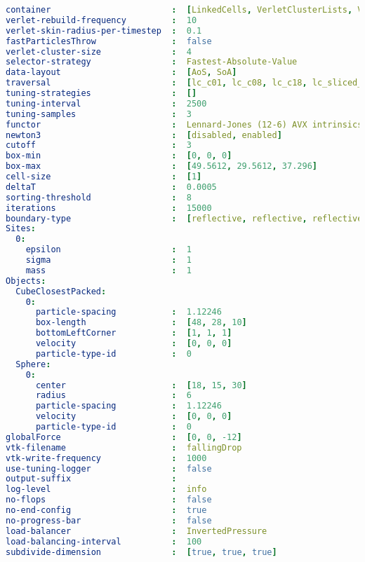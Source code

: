 \begin{lstlisting}[language=yaml,basicstyle=\tiny,  breaklines=true, caption={fallingDrop.yaml}, label={lst:fallingDrop}]
container                        :  [LinkedCells, VerletClusterLists, VerletLists, VerletListsCells]
verlet-rebuild-frequency         :  10
verlet-skin-radius-per-timestep  :  0.1
fastParticlesThrow               :  false
verlet-cluster-size              :  4
selector-strategy                :  Fastest-Absolute-Value
data-layout                      :  [AoS, SoA]
traversal                        :  [lc_c01, lc_c08, lc_c18, lc_sliced_c02, vcl_c01_balanced, vcl_c06, vcl_cluster_iteration, vl_list_iteration, vlc_c01, vlc_c18, vlc_sliced_c02]
tuning-strategies                :  []
tuning-interval                  :  2500
tuning-samples                   :  3
functor                          :  Lennard-Jones (12-6) AVX intrinsics
newton3                          :  [disabled, enabled]
cutoff                           :  3
box-min                          :  [0, 0, 0]
box-max                          :  [49.5612, 29.5612, 37.296]
cell-size                        :  [1]
deltaT                           :  0.0005
sorting-threshold                :  8
iterations                       :  15000
boundary-type                    :  [reflective, reflective, reflective]
Sites:                           
  0:
    epsilon                      :  1
    sigma                        :  1
    mass                         :  1
Objects:                         
  CubeClosestPacked:
    0:  
      particle-spacing           :  1.12246
      box-length                 :  [48, 28, 10]
      bottomLeftCorner           :  [1, 1, 1]
      velocity                   :  [0, 0, 0]
      particle-type-id           :  0
  Sphere:
    0:  
      center                     :  [18, 15, 30]
      radius                     :  6
      particle-spacing           :  1.12246
      velocity                   :  [0, 0, 0]
      particle-type-id           :  0
globalForce                      :  [0, 0, -12]
vtk-filename                     :  fallingDrop
vtk-write-frequency              :  1000
use-tuning-logger                :  false
output-suffix                    :  
log-level                        :  info
no-flops                         :  false
no-end-config                    :  true
no-progress-bar                  :  false
load-balancer                    :  InvertedPressure
load-balancing-interval          :  100
subdivide-dimension              :  [true, true, true]
\end{lstlisting}

